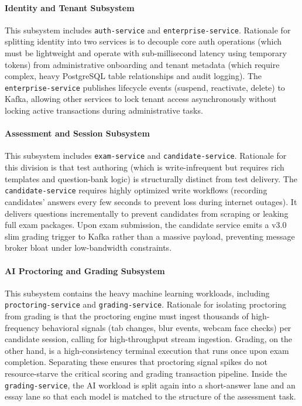 \paragraph{Identity and Tenant Subsystem}
This subsystem includes \texttt{auth-service} and \texttt{enterprise-service}. Rationale for splitting identity into two services is to decouple core auth operations (which must be lightweight and operate with sub-millisecond latency using temporary tokens) from administrative onboarding and tenant metadata (which require complex, heavy PostgreSQL table relationships and audit logging). The \texttt{enterprise-service} publishes lifecycle events (suspend, reactivate, delete) to Kafka, allowing other services to lock tenant access asynchronously without locking active transactions during administrative tasks.

\paragraph{Assessment and Session Subsystem}
This subsystem includes \texttt{exam-service} and \texttt{candidate-service}. Rationale for this division is that test authoring (which is write-infrequent but requires rich templates and question-bank logic) is structurally distinct from test delivery. The \texttt{candidate-service} requires highly optimized write workflows (recording candidates' answers every few seconds to prevent loss during internet outages). It delivers questions incrementally to prevent candidates from scraping or leaking full exam packages. Upon exam submission, the candidate service emits a v3.0 slim grading trigger to Kafka rather than a massive payload, preventing message broker bloat under low-bandwidth constraints.

\paragraph{AI Proctoring and Grading Subsystem}
This subsystem contains the heavy machine learning workloads, including \texttt{proctoring-service} and \texttt{grading-service}. Rationale for isolating proctoring from grading is that the proctoring engine must ingest thousands of high-frequency behavioral signals (tab changes, blur events, webcam face checks) per candidate session, calling for high-throughput stream ingestion. Grading, on the other hand, is a high-consistency terminal execution that runs once upon exam completion. Separating these ensures that proctoring signal spikes do not resource-starve the critical scoring and grading transaction pipeline. Inside the \texttt{grading-service}, the AI workload is split again into a short-answer lane and an essay lane so that each model is matched to the structure of the assessment task.

